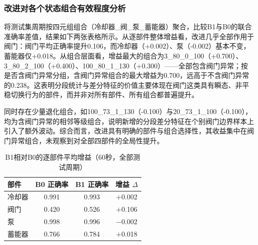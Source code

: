 \documentclass[12pt, a4paper]{ctexart}
\begin{document}
\subsubsection{改进对各个状态组合有效程度分析}
将测试集周期按四元组组合（冷却器\_阀\_泵\_蓄能器）聚合，比较B1与B0的联合准确率差值，结果如下两张表格所示。从逐部件整体增益看，改进几乎全部作用于阀门：阀门平均正确率提升0.106，而冷却器（+0.002）、泵（-0.002）基本不变，蓄能器仅+0.018。从组合层面看，增益最大的组合为3\_80\_0\_100（+0.700）、3\_80\_2\_100（+0.400）、100\_80\_1\_130（+0.300）——全部包含阀门异常；按是否含阀门异常分组，含阀门异常组合的最大增益为0.700，远高于不含阀门异常的0.238。这表明分段统计与差分特征的价值主要体现在阀门这类具有瞬态、非平稳切换行为的部件，而并非对所有部件、所有组合都普遍提升。

同时存在少量退化组合，如100\_73\_1\_130（-0.100）与20\_73\_1\_100（-0.100），均为含阀门异常的相邻等级组合，说明新增的分段差分特征在个别阀门边界样本上引入了额外波动。综合而言，改进具有明确的部件与组合选择性，其收益集中在阀门异常组合，未观察到对全部四部件的全局性提升。

\begin{table}[H]
  \centering
  \caption{B1相对B0的逐部件平均增益（60秒，全部测试周期）}
  \label{tab:improve_by_comp}
  \small
  \begin{tabular}{lccc}
    \toprule
    \textbf{部件} & \textbf{B0 正确率} & \textbf{B1 正确率} & \textbf{增益 $\Delta$} \\
    \midrule
    冷却器 & 0.991 & 0.993 & $+$0.002 \\
    阀门   & 0.420 & 0.526 & $+$0.106 \\
    泵     & 0.998 & 0.996 & $-$0.002 \\
    蓄能器 & 0.766 & 0.784 & $+$0.018 \\
    \bottomrule
  \end{tabular}
\end{table}
\end{document}
